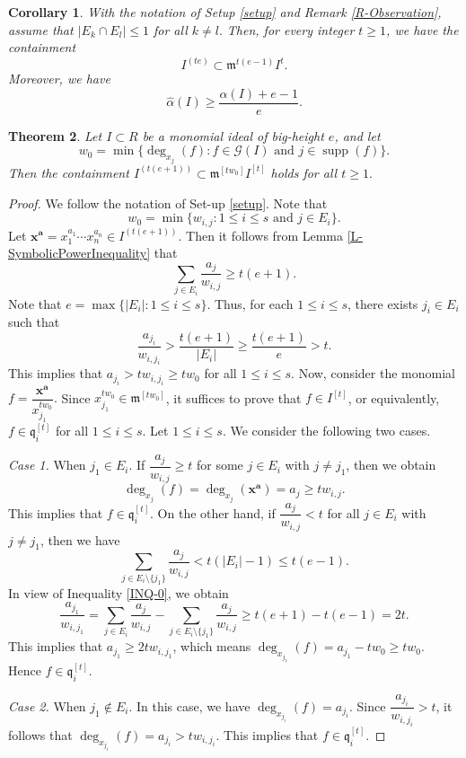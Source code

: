 \documentclass[12pt,reqno]{amsart}
\newtheorem{thm}{Theorem}[section]
\newtheorem{corollary}[thm]{Corollary}
\theoremstyle{definition}
\newcommand{\mi}{\mathfrak{m}}
\newcommand{\q}{\mathfrak{q}}
\newcommand{\x}{\mathbf{x}}
\newcommand{\ba}{\mathbf{a}}
\newcommand{\supp}[1]{\operatorname{supp}\left(#1\right)}
\newcommand{\ww}{\widehat{\alpha}}
\numberwithin{equation}{section}
\begin{document}
\begin{corollary}\label{C-LowerBound}
    With the notation of Setup \ref{setup} and Remark \ref{R-Observation}, assume that $|E_k \cap E_l| \le 1$ for all $k \ne l.$ Then, for every integer $t \ge 1$, we have the containment
    \[I^{(te)} \subset \mi^{t(e - 1)} I^t.\]
    Moreover, we have
    \[\ww(I) \ge \dfrac{\alpha(I) + e - 1}{e}.\]
\end{corollary}

\begin{thm}\label{Th-RevisedBound}
    Let $I \subset R$ be a monomial ideal of big-height $e$, and let
    \[w_0 = \min\{\deg_{x_j}(f) : f \in \mathcal{G}(I) \text{ and } j \in \supp f\}.\] Then the containment $I^{(t(e + 1))} \subset \mi^{[tw_0]} I^{[t]}$ holds for all $t \ge 1.$
\end{thm}

\begin{proof}
    We follow the notation of Set-up \ref{setup}. Note that 
    \[w_0 = \min\{w_{i, j} : 1 \le i \le s \text{ and } j \in E_i\}.\]
    Let $\x^{\ba} = x_1^{a_1} \cdots x_n^{a_n} \in I^{(t(e+1))}.$ Then it follows from Lemma \ref{L-SymbolicPowerInequality} that 
    \begin{equation}\label{INQ-0}
        \sum_{j \in E_i} \dfrac{a_j}{w_{i, j}} \ge t(e+1).
    \end{equation}
    Note that $e = \max\{ |E_i| : 1 \le i \le s\}.$ Thus, for each $1 \le i \le s$, there exists $j_i \in E_i$ such that 
    \[\dfrac{a_{j_i}} {w_{i, {j_i}}} > \dfrac{t(e + 1)}{|E_i|} \ge \dfrac{t(e + 1)}{e} > t.\]
    This implies that $a_{j_i} > t w_{i, {j_i}} \ge t w_0$ for all $1 \le i \le s.$ Now, consider the monomial $f = \dfrac{\x^{\ba}}{x_{j_1}^{t w_0}}.$ Since $x_{j_1}^{t w_0} \in \mi^{[tw_0]}$, it suffices to prove that $f \in I^{[t]}$, or equivalently, $f \in \q_i^{[t]}$ for all $1 \le i \le s.$ Let $1 \le i \le s.$ We consider the following two cases.
    
    \medskip\noindent
    \textit{Case 1.} When $j_1 \in E_i.$ If $\dfrac{a_j}{w_{i, j}} \ge t$ for some $j \in E_i$ with $j \ne j_1$, then we obtain
    \[\deg_{x_j}(f) = \deg_{x_j}(\x^{\ba}) = a_j \ge tw_{i, j}.\]
    This implies that $f \in \q_i^{[t]}.$ On the other hand, if $\dfrac{a_j}{w_{i, j}} < t$ for all $j \in E_i$ with $j \ne j_1$, then we have
    \[\sum_{j \in E_i \setminus \{j_1\}} \dfrac{a_j}{w_{i, j}} < t(|E_i| - 1) \le t(e - 1).\]
    In view of Inequality \ref{INQ-0}, we obtain
    \[\dfrac{a_{j_1}}{w_{i, j_1}} = \sum_{j \in E_i} \dfrac{a_j}{w_{i, j}} - \sum_{j \in E_i \setminus \{j_1\}} \dfrac{a_j}{w_{i, j}} \ge t(e + 1) - t(e - 1) = 2t.\]
    This implies that $a_{j_1} \ge 2t w_{i, j_1}$, which means $\deg_{x_{j_1}}(f) =  a_{j_1} - t w_0 \ge t w_0.$ Hence $f \in \q_i^{[t]}.$

    \medskip\noindent 
    \textit{Case 2.} When $j_1 \notin E_i.$ In this case, we have $\deg_{x_{j_i}}(f) = a_{j_i}.$ Since $\dfrac{a_{j_i}}{w_{i, j_i}} > t$, it follows that $\deg_{x_{j_i}}(f) = a_{j_i} > t w_{i, j_i}.$ This implies that $f \in \q_i^{[t]}.$
\end{proof}
\end{document}
